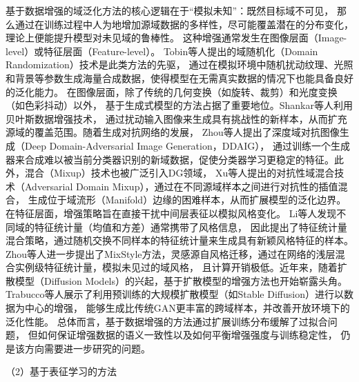基于数据增强的域泛化方法的核心逻辑在于“模拟未知”：既然目标域不可见，
那么通过在训练过程中人为地增加源域数据的多样性，尽可能覆盖潜在的分布变化，理论上便能提升模型对未见域的鲁棒性。
这种增强通常发生在图像层面（Image-level）或特征层面（Feature-level）。
Tobin等人\cite{tobin2017domain}提出的域随机化（Domain Randomization）技术是此类方法的先驱，
通过在模拟环境中随机扰动纹理、光照和背景等参数生成海量合成数据，使得模型在无需真实数据的情况下也能具备良好的泛化能力。
在图像层面，除了传统的几何变换（如旋转、裁剪）和光度变换（如色彩抖动）以外，
基于生成式模型的方法占据了重要地位。Shankar等人\cite{shankar2018generalizing}利用贝叶斯数据增强技术，
通过扰动输入图像来生成具有挑战性的新样本，从而扩充源域的覆盖范围。随着生成对抗网络的发展，
Zhou等人\cite{zhou2020deep}提出了深度域对抗图像生成（Deep Domain-Adversarial Image Generation，DDAIG），
通过训练一个生成器来合成难以被当前分类器识别的新域数据，促使分类器学习更稳定的特征。此外，混合（Mixup）技术也被广泛引入DG领域，
Xu等人\cite{xu2020adversarial}提出的对抗性域混合技术（Adversarial Domain Mixup），通过在不同源域样本之间进行对抗性的插值混合，
生成位于域流形（Manifold）边缘的困难样本，从而扩展模型的泛化边界。
在特征层面，增强策略旨在直接干扰中间层表征以模拟风格变化。
Li等人\cite{li2021simple}发现不同域的特征统计量（均值和方差）通常携带了风格信息，
因此提出了特征统计量混合策略，通过随机交换不同样本的特征统计量来生成具有新颖风格特征的样本。
Zhou等人\cite{zhou2021domain}进一步提出了MixStyle方法，灵感源自风格迁移，通过在网络的浅层混合实例级特征统计量，模拟未见过的域风格，
且计算开销极低。近年来，随着扩散模型（Diffusion Models）的兴起，基于扩散模型的增强方法也开始崭露头角。
Trabucco等人\cite{trabucco2023effective}展示了利用预训练的大规模扩散模型（如Stable Diffusion）进行以数据为中心的增强，
能够生成比传统GAN更丰富的跨域样本，并改善开放环境下的泛化性能。
总体而言，基于数据增强的方法通过扩展训练分布缓解了过拟合问题，
但如何保证增强数据的语义一致性以及如何平衡增强强度与训练稳定性，
仍是该方向需要进一步研究的问题\cite{wang2022generalizing}。



（2）基于表征学习的方法

